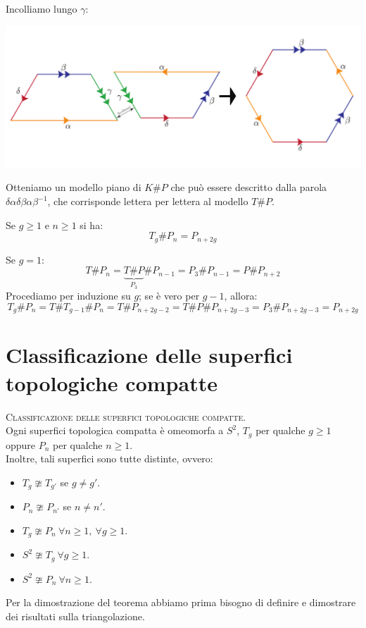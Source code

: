 \begin{demonstration}
\begin{center}
\end{center}
Incolliamo lungo $\gamma$:
\begin{center}
	\includegraphics[trim=0cm 0cm 0cm 0cm, clip, scale=0.3]{images/kleinplusproj2.pdf}
\end{center}
Otteniamo un modello piano di $K\# P$ che può essere descritto dalla parola $\delta \alpha \delta\beta\alpha\beta^{-1}$, che corrisponde lettera per lettera al modello $T\# P$.
\end{demonstration}
\begin{corollary}\label{toropiupiano}
Se $g\geq 1$ e $n\geq 1$ si ha:
\begin{equation}
	T_g\# P_n=P_{n+2g}
\end{equation}
\vspace{-6mm}
\end{corollary}
\begin{demonstration}
	Se $g=1$:
	\begin{equation*}
		T\# P_n=\underbrace{T\# P}_{P_3}\# P_{n-1}=P_3\# P_{n-1}=P\# P_{n+2}
	\end{equation*}
Procediamo per induzione su $g$; se è vero per $g-1$, allora:
\begin{equation*}
	T_g\# P_n=T\# T_{g-1}\# P_n=T\# P_{n+2g-2}=T\# P\# P_{n+2g-3}=P_3\# P_{n+2g-3}=P_{n+2g}
\end{equation*}
\end{demonstration}
\section{Classificazione delle superfici topologiche compatte}
\begin{theorema}\textsc{Classificazione delle superfici topologiche compatte.}\\
Ogni superfici topologica compatta è omeomorfa a $S^2$, $T_g$ per qualche $g\geq 1$ oppure $P_n$ per qualche $n\geq 1$.\\
Inoltre, tali superfici sono tutte distinte, ovvero:
\begin{itemize}
	\item $T_g\ncong T_{g'}$ se $g\neq g'$.
	\item $P_n\ncong P_{n'}$ se $n\neq n'$.
	\item $T_g\ncong P_{n}\ \forall n\geq 1,\ \forall g\geq 1$.
	\item $S^2\ncong T_g\ \forall g\geq 1$.
	\item $S^2\ncong P_n\ \forall n\geq 1$.
\end{itemize}
\vspace{-3mm}
\end{theorema}
Per la dimostrazione del teorema abbiamo prima bisogno di definire e dimostrare dei risultati sulla triangolazione.
